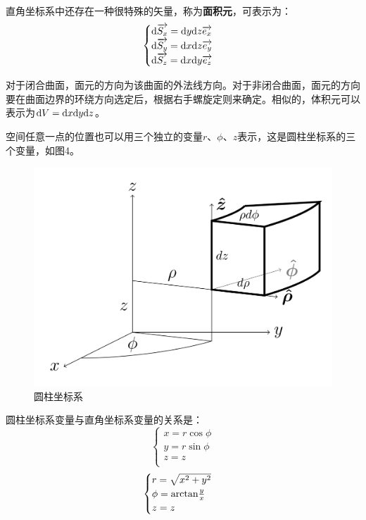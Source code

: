 \documentclass[UTF8,a4paper,11pt]{article}
\begin{document}
直角坐标系中还存在一种很特殊的矢量，称为\textbf{面积元}，可表示为：
\begin{equation}
\begin{cases}
{\rm d}\overrightarrow{S_x}={\rm d}y{\rm d}z\overrightarrow{e_x} \\
{\rm d}\overrightarrow{S_y}={\rm d}x{\rm d}z\overrightarrow{e_y} \\
{\rm d}\overrightarrow{S_z}={\rm d}x{\rm d}y\overrightarrow{e_z} \\
\end{cases}
\end{equation}

对于闭合曲面，面元的方向为该曲面的外法线方向。对于非闭合曲面，面元的方向要在曲面边界的环绕方向选定后，根据右手螺旋定则来确定。相似的，体积元可以表示为${\rm d}V={\rm d}x{\rm d}y{\rm d}z$。

空间任意一点的位置也可以用三个独立的变量$r$、$\phi$、$z$表示，这是圆柱坐标系的三个变量，如图4。
\begin{figure}[htbp]
\centering
\includegraphics[scale=0.2]{p4.png}
\caption{圆柱坐标系}
\end{figure}

圆柱坐标系变量与直角坐标系变量的关系是：
\begin{equation}
\begin{cases}
x=r\cos\phi \\
y=r\sin\phi \\
z=z \\
\end{cases}
\end{equation}
\begin{equation}
\begin{cases}
r=\sqrt{x^2+y^2} \\
\phi={\rm arctan}\frac{y}{x} \\
z=z \\
\end{cases}
\end{equation}
\end{document}

